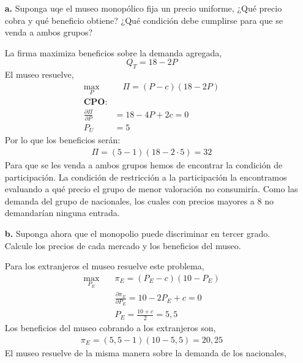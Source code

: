 \documentclass{exam}
\begin{document}
\begin{itemize}
    \item[\textbf{a.}] Suponga uqe el museo monopólico fija un precio uniforme, ¿Qué precio cobra y qué beneficio obtiene? ¿Qué condición debe cumplirse para que se venda a ambos grupos?
    \begin{solution}
        La firma maximiza beneficios sobre la demanda agregada,
        \begin{equation*}
            Q_T = 18-2P
        \end{equation*}
        El museo resuelve,
        \begin{align*}
            \max_{P} & \quad \Pi = (P-c)(18-2P) \\
            \textbf{CPO:} & \\
            \frac{\partial \Pi}{\partial P} & = 18-4P + 2c = 0 \\
            P_U &= 5
        \end{align*}
        Por lo que los beneficios serán:
        \begin{align*}
            \Pi = (5-1)(18-2\cdot 5) = 32
        \end{align*}
        Para que se les venda a ambos grupos hemos de encontrar la condición de participación. La condición de restricción a la participación la encontramos evaluando a qué precio el grupo de menor valoración no consumiría. Como las demanda del grupo de nacionales, los cuales con precios mayores a 8 no demandarían ninguna entrada. 
    \end{solution}
    \item[\textbf{b.}] Suponga ahora que el monopolio puede discriminar en tercer grado. Calcule los precios de cada mercado y los beneficios del museo.
    \begin{solution}
        Para los extranjeros el museo resuelve este problema,
        \begin{align*}
            \max_{P_{E}} \quad & \pi_E = (P_E-c)(10-P_E) \\
            & \frac{\partial  \pi_E}{\partial P_E} = 10 - 2P_E + c = 0 \\
            & P_E = \frac{10+c}{2} = 5,5
        \end{align*}
        Los beneficios del museo cobrando a los extranjeros son, 
        \begin{align*}
            \pi_E = (5,5-1)(10-5,5) = 20,25
        \end{align*}
        El museo resuelve de la misma manera sobre la demanda de los nacionales,

\end{solution}
\end{itemize}
\end{document}
